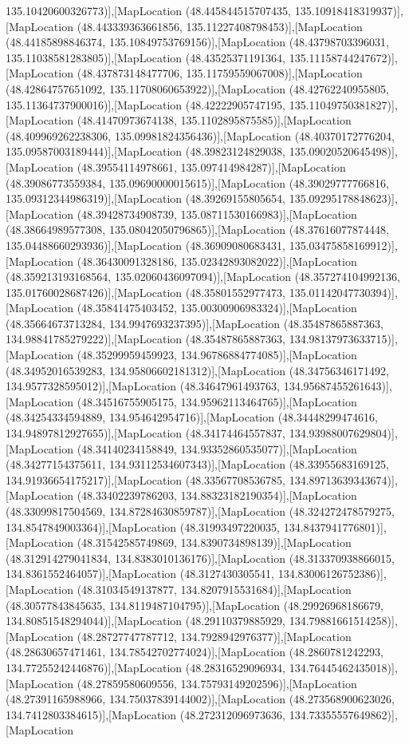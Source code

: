 135.10420600326773)],[MapLocation (48.445844515707435, 135.10918418319937)],[MapLocation (48.443339363661856, 135.11227408798453)],[MapLocation (48.44185898846374, 135.10849753769156)],[MapLocation (48.43798703396031, 135.11038581283805)],[MapLocation (48.43525371191364, 135.11158744247672)],[MapLocation (48.437873148477706, 135.11759559067008)],[MapLocation (48.42864757651092, 135.11708060653922)],[MapLocation (48.42762240955805, 135.11364737900016)],[MapLocation (48.42222905747195, 135.11049750381827)],[MapLocation (48.41470973674138, 135.1102895875585)],[MapLocation (48.409969262238306, 135.09981824356436)],[MapLocation (48.40370172776204, 135.09587003189444)],[MapLocation (48.39823124829038, 135.09020520645498)],[MapLocation (48.39554114978661, 135.097414984287)],[MapLocation (48.39086773559384, 135.09690000015615)],[MapLocation (48.39029777766816, 135.09312344986319)],[MapLocation (48.39269155805654, 135.09295178848623)],[MapLocation (48.39428734908739, 135.08711530166983)],[MapLocation (48.38664989577308, 135.08042050796865)],[MapLocation (48.37616077874448, 135.04488660293936)],[MapLocation (48.36909080683431, 135.03475858169912)],[MapLocation (48.36430091328186, 135.02342893082022)],[MapLocation (48.359213193168564, 135.02060436097094)],[MapLocation (48.357274104992136, 135.01760028687426)],[MapLocation (48.35801552977473, 135.01142047730394)],[MapLocation (48.35841475403452, 135.00300906983324)],[MapLocation (48.35664673713284, 134.9947693237395)],[MapLocation (48.35487865887363, 134.98841785279222)],[MapLocation (48.35487865887363, 134.98137973633715)],[MapLocation (48.35299959459923, 134.96786884774085)],[MapLocation (48.34952016539283, 134.95806602181312)],[MapLocation (48.34756346171492, 134.9577328595012)],[MapLocation (48.34647961493763, 134.95687455261643)],[MapLocation (48.34516755905175, 134.95962113464765)],[MapLocation (48.34254334594889, 134.954642954716)],[MapLocation (48.34448299474616, 134.94897812927655)],[MapLocation (48.34174464557837, 134.93988007629804)],[MapLocation (48.34140234158849, 134.93352860535077)],[MapLocation (48.34277154375611, 134.93112534607343)],[MapLocation (48.33955683169125, 134.91936654175217)],[MapLocation (48.33567708536785, 134.89713639343674)],[MapLocation (48.33402239786203, 134.88323182190354)],[MapLocation (48.33099817504569, 134.87284630859787)],[MapLocation (48.324272478579275, 134.8547849003364)],[MapLocation (48.31993497220035, 134.8437941776801)],[MapLocation (48.31542585749869, 134.8390734898139)],[MapLocation (48.312914279041834, 134.8383010136176)],[MapLocation (48.313370938866015, 134.8361552464057)],[MapLocation (48.3127430305541, 134.83006126752386)],[MapLocation (48.31034549137877, 134.8207915531684)],[MapLocation (48.30577843845635, 134.8119487104795)],[MapLocation (48.29926968186679, 134.80851548294044)],[MapLocation (48.29110379885929, 134.79881661514258)],[MapLocation (48.28727747787712, 134.7928942976377)],[MapLocation (48.28630657471461, 134.78542702774024)],[MapLocation (48.2860781242293, 134.77255242446876)],[MapLocation (48.28316529096934, 134.76445462435018)],[MapLocation (48.27859580609556, 134.75793149202596)],[MapLocation (48.27391165988966, 134.75037839144002)],[MapLocation (48.273568900623026, 134.7412803384615)],[MapLocation (48.272312096973636, 134.73355557649862)],[MapLocation 